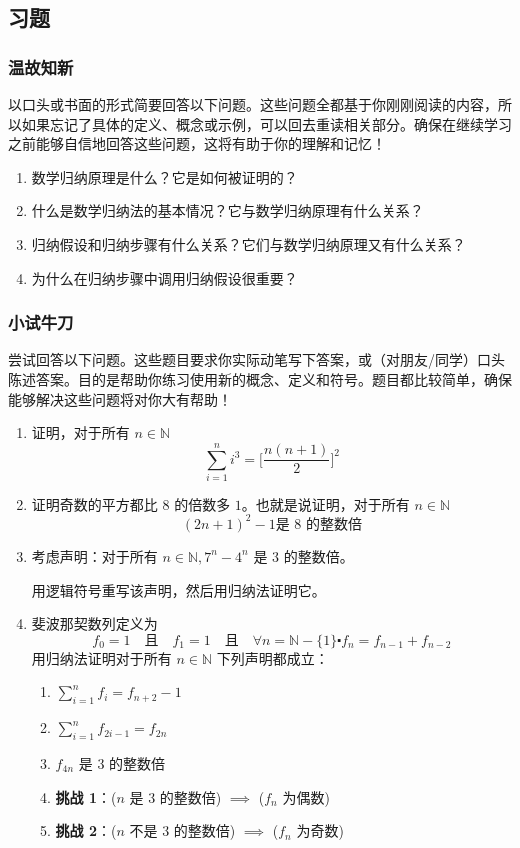 \subsection{习题}

\subsubsection*{温故知新}

以口头或书面的形式简要回答以下问题。这些问题全都基于你刚刚阅读的内容，所以如果忘记了具体的定义、概念或示例，可以回去重读相关部分。确保在继续学习之前能够自信地回答这些问题，这将有助于你的理解和记忆！

\begin{enumerate}[label=(\arabic*)]
    \item 数学归纳原理是什么？它是如何被证明的？
    \item 什么是数学归纳法的基本情况？它与数学归纳原理有什么关系？
    \item 归纳假设和归纳步骤有什么关系？它们与数学归纳原理又有什么关系？
    \item 为什么在归纳步骤中调用归纳假设很重要？
\end{enumerate}

\subsubsection*{小试牛刀}

尝试回答以下问题。这些题目要求你实际动笔写下答案，或（对朋友/同学）口头陈述答案。目的是帮助你练习使用新的概念、定义和符号。题目都比较简单，确保能够解决这些问题将对你大有帮助！

\begin{enumerate}[label=(\arabic*)]
    \item 证明，对于所有 $n \in \mathbb{N}$
        \[\sum_{i=1}^{n} i^3 = \bigg[\frac{n(n+1)}{2}\bigg]^2\]
    \item 证明奇数的平方都比 $8$ 的倍数多 $1$。也就是说证明，对于所有 $n \in \mathbb{N}$
        \[(2n+1)^2-1 \text{是 8 的整数倍}\]
    \item 考虑声明：对于所有 $n \in \mathbb{N}, 7^n-4^n$ 是 $3$ 的整数倍。
    
    用逻辑符号重写该声明，然后用归纳法证明它。
    \item 斐波那契数列定义为
    \[f_0=1 \quad\text{且}\quad f_1=1 \quad\text{且}\quad \forall n=\mathbb{N}-\{1\} \centerdot f_n=f_{n-1}+f_{n-2}\]
    用归纳法证明对于所有 $n \in \mathbb{N}$ 下列声明都成立：
    \begin{enumerate}[label=(\alph*)]
        \item $\displaystyle\sum_{i=1}^{n} f_i = f_{n+2}-1$
        \item $\displaystyle\sum_{i=1}^{n} f_{2i-1} = f_{2n}$
        \item $f_{4n}$ 是 $3$ 的整数倍
        \item \textbf{挑战 1}：($n$ 是 $3$ 的整数倍) $\implies$ ($f_n$ 为偶数)
        \item \textbf{挑战 2}：($n$ 不是 $3$ 的整数倍) $\implies$ ($f_n$ 为奇数)
    \end{enumerate}
\end{enumerate}